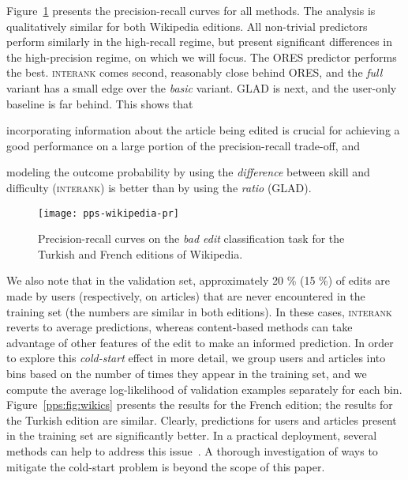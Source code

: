 Figure~\ref{pps:fig:wikipr} presents the precision-recall curves for all methods.
The analysis is qualitatively similar for both Wikipedia editions.
All non-trivial predictors perform similarly in the high-recall regime, but present significant differences in the high-precision regime, on which we will focus.
The ORES predictor performs the best.
\textsc{interank} comes second, reasonably close behind ORES, and the \emph{full} variant has a small edge over the \emph{basic} variant.
GLAD is next, and the user-only baseline is far behind.
This shows that
\begin{enuminline}
	\item incorporating information about the article being edited is crucial for achieving a good performance on a large portion of the precision-recall trade-off, and
	\item modeling the outcome probability by using the \emph{difference} between skill and difficulty (\textsc{interank}) is better than by using the \emph{ratio} (GLAD).
\end{enuminline}

\begin{figure}
	\centering
	\texttt{[image: pps-wikipedia-pr]}
	\caption{Precision-recall curves on the \emph{bad edit} classification task for the Turkish and French editions of Wikipedia.}
	\label{pps:fig:wikipr}
\end{figure}

We also note that in the validation set, approximately \num{20} \% (\num{15} \%) of edits are made by users (respectively, on articles) that are never encountered in the training set (the numbers are similar in both editions).
In these cases, \textsc{interank} reverts to average predictions, whereas content-based methods can take advantage of other features of the edit to make an informed prediction.
In order to explore this \emph{cold-start} effect in more detail, we group users and articles into bins based on the number of times they appear in the training set, and we compute the average log-likelihood of validation examples separately for each bin.
Figure~\ref{pps:fig:wikics} presents the results for the French edition;
the results for the Turkish edition are similar.
Clearly, predictions for users and articles present in the training set are significantly better.
In a practical deployment, several methods can help to address this issue~\citep{schein2002methods, lam2008addressing, levi2012finding}.
A thorough investigation of ways to mitigate the cold-start problem is beyond the scope of this paper.

